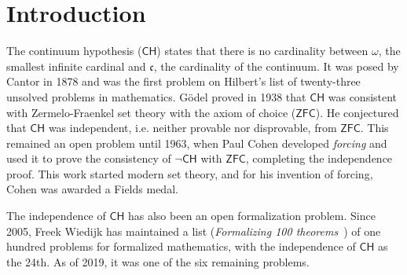 \documentclass[sigplan,10pt,review]{acmart}
\newcommand{\ZFC}{\mathsf{ZFC}}
\newcommand{\CH}{\mathsf{CH}}
\theoremstyle{definition}
\begin{document}



\maketitle


\section{Introduction}
\label{sect:intro}
The continuum hypothesis ($\mathsf{CH}$) states that there is no cardinality between $\omega$, the smallest infinite cardinal and $\mathfrak{c}$, the cardinality of the continuum.
It was posed by Cantor \cite{cantor1878beitrag} in 1878 and was the first problem on Hilbert's list of twenty-three unsolved problems in mathematics.
G\"odel \cite{godel1938consistency} proved in 1938 that $\mathsf{CH}$ was consistent with Zermelo-Fraenkel set theory with the axiom of choice ($\ZFC$). He conjectured that \(\mathsf{CH}\) was independent, i.e. neither provable nor disprovable, from \(\ZFC\). This remained an open problem until 1963, when Paul Cohen developed \emph{forcing} \cite{cohen-the-independence-of-the-continuum-hypothesis-1,cohen1964independence2} and used it to prove the consistency of $\neg \mathsf{CH}$ with \(\ZFC\), completing the independence proof. This work started modern set theory, and for his invention of forcing, Cohen was awarded a Fields medal.

The independence of \(\CH\) has also been an open formalization problem. Since 2005, Freek Wiedijk has maintained a list (\emph{Formalizing 100 theorems}~\cite{wiedijk100theorems}) of one hundred problems for formalized mathematics, with the independence of \(\CH\) as the 24th. As of 2019, it was one of the six remaining problems.
\end{document}
